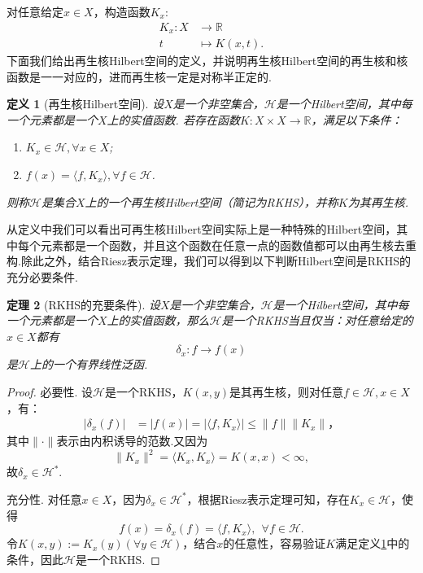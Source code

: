 \documentclass[12pt, a4paper, oneside]{ctexbook}
\newtheorem{theorem}{定理}[section]
\newtheorem{definition}[theorem]{定义}
\begin{document}
对任意给定$x\in X$，构造函数$K_x$:
\begin{equation}\label{def:k_x}
    \begin{aligned}
K_x:X & \to\mathbb{R} \\
t & \mapsto K(x,t).
\end{aligned}
\end{equation}
下面我们给出再生核Hilbert空间的定义，并说明再生核Hilbert空间的再生核和核函数是一一对应的，进而再生核一定是对称半正定的.
\begin{definition}[再生核Hilbert空间]\label{def:RKHS}
    设$X$是一个非空集合，$\mathcal{H}$是一个Hilbert空间，其中每一个元素都是一个$X$上的实值函数. 若存在函数$K:X\times X\to\mathbb{R}$，满足以下条件：
    \begin{enumerate}
        \item $K_x\in\mathcal{H},\forall x\in X$;
        \item $f(x)=\langle f,K_x\rangle,\forall f\in\mathcal{H}$.
    \end{enumerate}
    则称$\mathcal{H}$是集合$X$上的一个再生核Hilbert空间（简记为RKHS），并称$K$为其再生核.
\end{definition}

从定义中我们可以看出可再生核Hilbert空间实际上是一种特殊的Hilbert空间，其中每个元素都是一个函数，并且这个函数在任意一点的函数值都可以由再生核去重构.除此之外，结合Riesz表示定理，我们可以得到以下判断Hilbert空间是RKHS的充分必要条件.

\begin{theorem}[RKHS的充要条件]
    设$X$是一个非空集合，$\mathcal{H}$是一个Hilbert空间，其中每一个元素都是一个$X$上的实值函数，那么$\mathcal{H}$是一个RKHS当且仅当：对任意给定的$x\in X$都有
    \begin{equation*}
        \delta_x:f\to f(x)
    \end{equation*}
    是$\mathcal{H}$上的一个有界线性泛函.
\end{theorem}

\begin{proof}
    必要性. 设$\mathcal{H}$是一个RKHS，$K(x,y)$是其再生核，则对任意$f\in\mathcal{H},x\in X$，有：
    \begin{align*}
        |\delta_x(f)|&=|f(x)|=|\langle f,K_x\rangle| \leq \|f\|\|K_x\|，
    \end{align*}
    其中$\|\cdot\|$表示由内积诱导的范数.又因为
    \begin{equation*}
        \|K_x\|^2=\langle K_x,K_x\rangle =K(x,x)<\infty,
    \end{equation*}
    故$\delta_x\in\mathcal{H}^*$.

    充分性. 对任意$x\in X$，因为$\delta_x\in\mathcal{H}^*$，根据Riesz表示定理可知，存在$K_x\in\mathcal{H}$，使得
    \begin{equation*}
        f(x)=\delta_x(f)=\langle f,K_x\rangle,~~\forall f\in\mathcal{H}.
    \end{equation*} 
    令$K(x,y):=K_x(y)(\forall y\in\mathcal{H})$，结合$x$的任意性，容易验证$K$满足定义\ref{def:RKHS}中的条件，因此$\mathcal{H}$是一个RKHS.
\end{proof}
\end{document}
